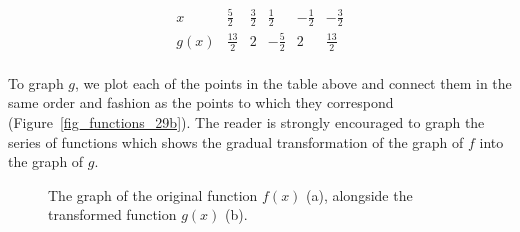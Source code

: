 \begin{example}
\renewcommand{\arraystretch}{1.5}
\[  \begin{array}{c|ccccc}  
 x &  \frac{5}{2}&\frac{3}{2}&\frac{1}{2}&-\frac{1}{2}&-\frac{3}{2}\\ \hline
 g(x)& \frac{13}{2}  & 2 & - \frac{5}{2}  & 2  & \frac{13}{2}  \\ 
\end{array} \]
\renewcommand{\arraystretch}{1}


To graph $g$, we plot each of the points in the table above and connect them in the same order and fashion as the points to which they correspond (Figure~\ref{fig_functions_29b}).  The reader is strongly encouraged to graph the series of functions which shows the gradual transformation of the graph of $f$ into the graph of $g$.  

\begin{figure}[H]
    \centering
    \centerline{
        \hspace{0.1cm}
    }
	\caption{The graph of the original function $f(x)$ (a), alongside the transformed function $g(x)$ (b).}
\end{figure}

\end{example}



